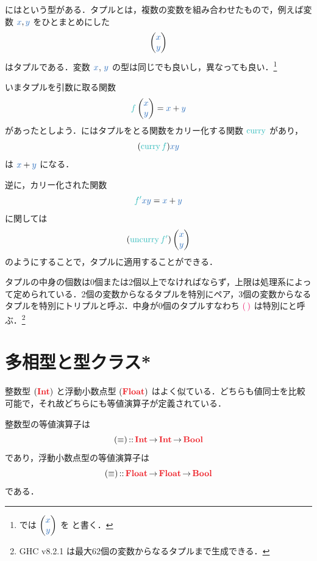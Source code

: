 \documentclass[a5paper,twoside,fleqn,draft]{jsbook}
\begin{document}
\separator

\haskell にはという型がある．タプルとは，複数の変数を組み合わせたもので，例えば変数 $\hVar{x},\hVar{y}$ をひとまとめにした
\begin{equation}
  \hPairWith{\hVar{x}}{\hVar{y}}
\end{equation}
はタプルである．変数 $\hVar{x}$, $\hVar{y}$ の型は同じでも良いし，異なっても良い．\footnote{\haskell では $\hPairWith{\hVar{x}}{\hVar{y}}$ を  と書く．}

いまタプルを引数に取る関数
\begin{equation}
  \hFunc{f}\hPairWith{\hVar{x}}{\hVar{y}}
  =\hVar{x}+\hVar{y}
\end{equation}
があったとしよう．\haskell にはタプルをとる関数をカリー化する関数 $\hCurry$ があり，
\begin{equation}
  (\hCurry\hFunc{f})\hVar{x}\hVar{y}
\end{equation}
は $\hVar{x}+\hVar{y}$ になる．

逆に，カリー化された関数
\begin{equation}
  \hFunc{f'}\hVar{x}\hVar{y}
  =\hVar{x}+\hVar{y}
\end{equation}
に関しては
\begin{equation}
  (\hUncurry\hFunc{f'})\hPairWith{\hVar{x}}{\hVar{y}}
\end{equation}
のようにすることで，タプルに適用することができる．

\separator

タプルの中身の個数は0個または2個以上でなければならず，上限は処理系によって定められている．2個の変数からなるタプルを特別にペア，3個の変数からなるタプルを特別にトリプルと呼ぶ．中身が0個のタプルすなわち $\hUnit$ は特別にと呼ぶ．\footnote{GHC v8.2.1 は最大62個の変数からなるタプルまで生成できる．}

\section{多相型と型クラス*}

整数型 $(\hInt)$ と浮動小数点型 $(\hFloat)$ はよく似ている．どちらも値同士を比較可能で，それ故どちらにも等値演算子が定義されている．

整数型の等値演算子は
\begin{equation}
  (\hIfEq)
  \hIsTypeOf\hInt\hFunctionArrow\hInt\hFunctionArrow\hBool
\end{equation}
であり，浮動小数点型の等値演算子は
\begin{equation}
  (\hIfEq)
  \hIsTypeOf\hFloat\hFunctionArrow\hFloat\hFunctionArrow\hBool
\end{equation}
である．
\end{document}
